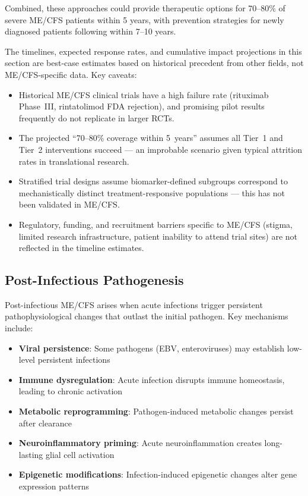 Combined, these approaches could provide therapeutic options for 70--80\% of severe ME/CFS patients within 5 years, with prevention strategies for newly diagnosed patients following within 7--10 years.

\begin{limitation}
The timelines, expected response rates, and cumulative impact projections in this section are best-case estimates based on historical precedent from other fields, not ME/CFS-specific data. Key caveats:
\begin{itemize}
    \item Historical ME/CFS clinical trials have a high failure rate (rituximab Phase~III, rintatolimod FDA rejection), and promising pilot results frequently do not replicate in larger RCTs.
    \item The projected ``70--80\% coverage within 5~years'' assumes all Tier~1 and Tier~2 interventions succeed --- an improbable scenario given typical attrition rates in translational research.
    \item Stratified trial designs assume biomarker-defined subgroups correspond to mechanistically distinct treatment-responsive populations --- this has not been validated in ME/CFS.
    \item Regulatory, funding, and recruitment barriers specific to ME/CFS (stigma, limited research infrastructure, patient inability to attend trial sites) are not reflected in the timeline estimates.
\end{itemize}
\end{limitation}

\subsection{Post-Infectious Pathogenesis}
\label{sec:post-infectious-pathogenesis}

Post-infectious ME/CFS arises when acute infections trigger persistent pathophysiological changes that outlast the initial pathogen. Key mechanisms include:

\begin{itemize}
    \item \textbf{Viral persistence}: Some pathogens (EBV, enteroviruses) may establish low-level persistent infections
    \item \textbf{Immune dysregulation}: Acute infection disrupts immune homeostasis, leading to chronic activation
    \item \textbf{Metabolic reprogramming}: Pathogen-induced metabolic changes persist after clearance
    \item \textbf{Neuroinflammatory priming}: Acute neuroinflammation creates long-lasting glial cell activation
    \item \textbf{Epigenetic modifications}: Infection-induced epigenetic changes alter gene expression patterns
\end{itemize}

